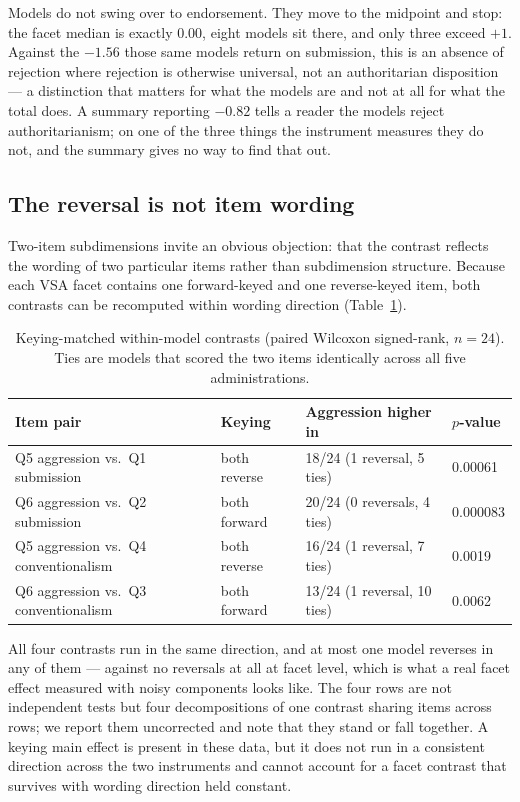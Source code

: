 \documentclass{article}
\begin{document}
Models do not swing over to endorsement. They move to the midpoint and
stop: the facet median is exactly 0.00, eight models sit there, and only
three exceed \(+1\). Against the \(-1.56\) those same models return on
submission, this is an absence of rejection where rejection is otherwise
universal, not an authoritarian disposition --- a distinction that
matters for what the models are and not at all for what the total does.
A summary reporting \(-0.82\) tells a reader the models reject
authoritarianism; on one of the three things the instrument measures
they do not, and the summary gives no way to find that out.

\subsection{The reversal is not item wording}\label{sec-wording}

Two-item subdimensions invite an obvious objection: that the contrast
reflects the wording of two particular items rather than subdimension
structure. Because each VSA facet contains one forward-keyed and one
reverse-keyed item, both contrasts can be recomputed within wording
direction  (Table~\ref{tab:keying}).

\begin{table}[t]
  \caption{Keying-matched within-model contrasts (paired Wilcoxon signed-rank, $n = 24$). Ties are models that scored the two items identically across all five administrations.}
  \label{tab:keying}
  \centering
  \small
  \begin{tabular}{llll}
    \toprule
    Item pair & Keying & Aggression higher in & $p$-value \\
    \midrule
    Q5 aggression vs.\ Q1 submission      & both reverse & 18/24 (1 reversal, 5 ties)  & 0.00061 \\
    Q6 aggression vs.\ Q2 submission      & both forward & 20/24 (0 reversals, 4 ties) & 0.000083 \\
    Q5 aggression vs.\ Q4 conventionalism & both reverse & 16/24 (1 reversal, 7 ties)  & 0.0019 \\
    Q6 aggression vs.\ Q3 conventionalism & both forward & 13/24 (1 reversal, 10 ties) & 0.0062 \\
    \bottomrule
  \end{tabular}
\end{table}

All four contrasts run in the same direction, and at most one model
reverses in any of them --- against no reversals at all at facet level,
which is what a real facet effect measured with noisy components looks
like. The four rows are not independent tests but four decompositions of
one contrast sharing items across rows; we report them uncorrected and
note that they stand or fall together. A keying main effect is present
in these data, but it does not run in a consistent direction across the
two instruments and cannot account for a facet contrast that survives
with wording direction held constant.
\end{document}
